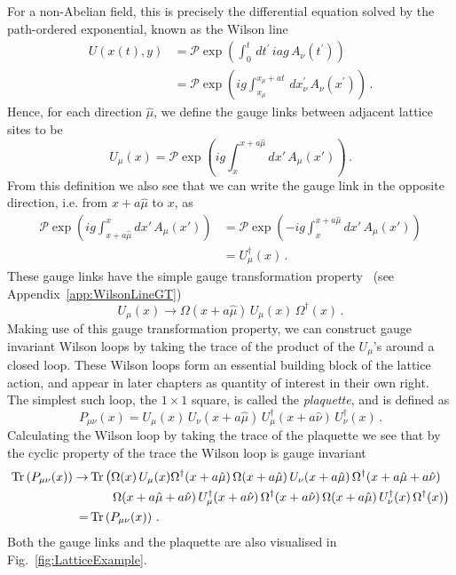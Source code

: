 For a non-Abelian field, this is precisely the differential equation solved by the path-ordered exponential, known as the Wilson line
%
\begin{align*}
U(x(t),y) &= \mathcal{P}\exp\left(\int_0^t \,dt^\prime\, iag \,A_\nu(t^\prime)\right)\\
&=\mathcal{P}\exp\left(ig\int_{x_\mu}^{x_\mu+at}\,dx_\nu^\prime\, A_\nu(x^\prime)\right)\, .
\end{align*}
%
Hence, for each direction $\hat{\mu}$, we define the gauge links between adjacent lattice sites to be
\begin{equation}
U_\mu(x) = \mathcal{P}\exp\left(ig\int_x^{x+a\hat{\mu}}dx'\,A_\mu(x')\right)\, .
\label{eq:GaugeLink}
\end{equation}
From this definition we also see that we can write the gauge link in the opposite direction, i.e. from $x+a\hat{\mu}$ to $x$, as
\begin{align*}
\mathcal{P}\exp\left(ig\int^x_{x+a\hat{\mu}}dx'\,A_\mu(x')\right) &= \mathcal{P}\exp\left(-ig\int_x^{x+a\hat{\mu}}dx'\,A_\mu(x')\right)\\
&=U^\dag_\mu(x)\, .
\end{align*}
These gauge links have the simple gauge transformation property~\cite{Lepage:1998dt} (see Appendix~\ref{app:WilsonLineGT})
%
\begin{equation}
U_\mu(x)\rightarrow \Omega(x+a\hat{\mu})\,U_\mu(x)\,\Omega^\dag(x)\, .
\label{eq:LinkTransformation}
\end{equation}
%
Making use of this gauge transformation property, we can construct gauge invariant Wilson loops by taking the trace of the product of the $U_\mu$'s around a closed loop. These Wilson loops form an essential building block of the lattice action, and  appear in later chapters as quantity of interest in their own right. The simplest such loop, the $1\times 1$ square, is called the \textit{plaquette}, and is defined as
\begin{equation}
P_{\mu\nu}(x) = U_\mu(x)\,U_\nu(x+a\hat{\mu})\, U_\mu^\dag(x+a\hat{\nu})\, U_\nu^\dag(x)\, .
\label{eq:Plaquette}
\end{equation}
Calculating the Wilson loop by taking the trace of the plaquette we see that by the cyclic property of the trace the Wilson loop is gauge invariant
\begin{align*}
\operatorname{Tr}\left(P_{\mu\nu}(x)\right)\rightarrow& \operatorname{Tr} \left(\Omega(x)\,U_\mu(x)\Omega^\dag(x+a\hat{\mu})\,\Omega(x+a\hat{\mu})\,U_\nu(x+a\hat{\mu})\,\Omega^\dag(x+a\hat{\mu}+a\hat{\nu})\right.\\
&~~~~~\left.\Omega(x+a\hat{\mu}+a\hat{\nu})\,U_\mu^\dag(x+a\hat{\nu})\,\Omega^\dag(x+a\hat{\nu})\,\Omega(x+a\hat{\mu})\, U_\nu^\dag(x)\,\Omega^\dag(x)\right)\\
=&\operatorname{Tr}\left(P_{\mu\nu}(x)\right)\, .
\end{align*}
Both the gauge links and the plaquette are also visualised in Fig.~\ref{fig:LatticeExample}.\\

